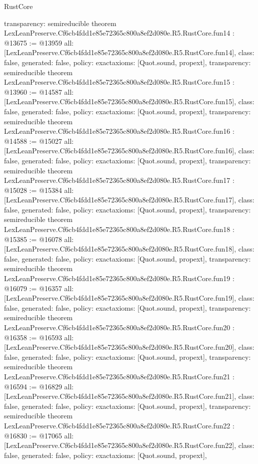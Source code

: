\begin{lexlean}{RustCore}
\begin{coremodule}
{  transparency: semireducible
}
theorem LexLeanPreserve.Cf6cb4fdd1e85e72365c800a8ef2d080e.R5.RustCore.fun14 : @13675 := @13959 {
  all: [LexLeanPreserve.Cf6cb4fdd1e85e72365c800a8ef2d080e.R5.RustCore.fun14],
  class: false,
  generated: false,
  policy: exact{axioms: [Quot.sound, propext]},
  transparency: semireducible
}
theorem LexLeanPreserve.Cf6cb4fdd1e85e72365c800a8ef2d080e.R5.RustCore.fun15 : @13960 := @14587 {
  all: [LexLeanPreserve.Cf6cb4fdd1e85e72365c800a8ef2d080e.R5.RustCore.fun15],
  class: false,
  generated: false,
  policy: exact{axioms: [Quot.sound, propext]},
  transparency: semireducible
}
theorem LexLeanPreserve.Cf6cb4fdd1e85e72365c800a8ef2d080e.R5.RustCore.fun16 : @14588 := @15027 {
  all: [LexLeanPreserve.Cf6cb4fdd1e85e72365c800a8ef2d080e.R5.RustCore.fun16],
  class: false,
  generated: false,
  policy: exact{axioms: [Quot.sound, propext]},
  transparency: semireducible
}
theorem LexLeanPreserve.Cf6cb4fdd1e85e72365c800a8ef2d080e.R5.RustCore.fun17 : @15028 := @15384 {
  all: [LexLeanPreserve.Cf6cb4fdd1e85e72365c800a8ef2d080e.R5.RustCore.fun17],
  class: false,
  generated: false,
  policy: exact{axioms: [Quot.sound, propext]},
  transparency: semireducible
}
theorem LexLeanPreserve.Cf6cb4fdd1e85e72365c800a8ef2d080e.R5.RustCore.fun18 : @15385 := @16078 {
  all: [LexLeanPreserve.Cf6cb4fdd1e85e72365c800a8ef2d080e.R5.RustCore.fun18],
  class: false,
  generated: false,
  policy: exact{axioms: [Quot.sound, propext]},
  transparency: semireducible
}
theorem LexLeanPreserve.Cf6cb4fdd1e85e72365c800a8ef2d080e.R5.RustCore.fun19 : @16079 := @16357 {
  all: [LexLeanPreserve.Cf6cb4fdd1e85e72365c800a8ef2d080e.R5.RustCore.fun19],
  class: false,
  generated: false,
  policy: exact{axioms: [Quot.sound, propext]},
  transparency: semireducible
}
theorem LexLeanPreserve.Cf6cb4fdd1e85e72365c800a8ef2d080e.R5.RustCore.fun20 : @16358 := @16593 {
  all: [LexLeanPreserve.Cf6cb4fdd1e85e72365c800a8ef2d080e.R5.RustCore.fun20],
  class: false,
  generated: false,
  policy: exact{axioms: [Quot.sound, propext]},
  transparency: semireducible
}
theorem LexLeanPreserve.Cf6cb4fdd1e85e72365c800a8ef2d080e.R5.RustCore.fun21 : @16594 := @16829 {
  all: [LexLeanPreserve.Cf6cb4fdd1e85e72365c800a8ef2d080e.R5.RustCore.fun21],
  class: false,
  generated: false,
  policy: exact{axioms: [Quot.sound, propext]},
  transparency: semireducible
}
theorem LexLeanPreserve.Cf6cb4fdd1e85e72365c800a8ef2d080e.R5.RustCore.fun22 : @16830 := @17065 {
  all: [LexLeanPreserve.Cf6cb4fdd1e85e72365c800a8ef2d080e.R5.RustCore.fun22],
  class: false,
  generated: false,
  policy: exact{axioms: [Quot.sound, propext]},
}
\end{coremodule}
\end{lexlean}
